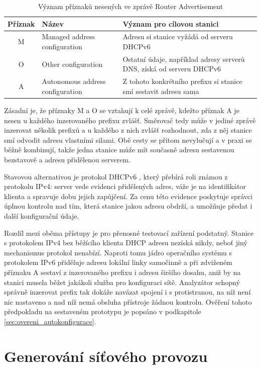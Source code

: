 \begin{table}[htbp]
    \caption{Význam příznaků nesených ve zprávě Router Advertisement}
    \label{tab:priznaky}
    \centering
    \begin{tabular}{clp{7.5cm}}
        \hline
        Příznak & Název & Význam pro cílovou stanici \\
        \hline
        M & Managed address configuration & Adresu si stanice vyžádá od serveru DHCPv6 \\
        O & Other configuration & Ostatní údaje, například adresy serverů DNS, získá od serveru DHCPv6 \\
        A & Autonomous address configuration & Z tohoto konkrétního prefixu si stanice smí sestavit adresu sama \\
        \hline
    \end{tabular}
\end{table}

Zásadní je, že příznaky M a O se vztahují k celé zprávě, kdežto příznak A je nesen u každého inzerovaného prefixu zvlášť. Směrovač tedy může v jediné zprávě inzerovat několik prefixů a u každého z nich zvlášť rozhodnout, zda z něj stanice smí odvodit adresu vlastními silami. Obě cesty se přitom nevylučují a v praxi se běžně kombinují, takže jedna stanice může mít současně adresu sestavenou bezstavově a adresu přidělenou serverem.

Stavovou alternativou je protokol DHCPv6 \cite{rfc8415}, který přebírá roli známou z protokolu IPv4: server vede evidenci přidělených adres, váže je na identifikátor klienta a spravuje dobu jejich zapůjčení. Za cenu této evidence poskytuje správci úplnou kontrolu nad tím, která stanice jakou adresu obdrží, a umožňuje předat i další konfigurační údaje.

Rozdíl mezi oběma přístupy je pro přenosné testovací zařízení podstatný. Stanice s protokolem IPv4 bez běžícího klienta DHCP adresu nezíská nikdy, neboť jiný mechanismus protokol nenabízí. Naproti tomu jádro operačního systému s protokolem IPv6 přiděluje adresu lokální linky samočinně a při zdviženém příznaku A sestaví z inzerovaného prefixu i adresu širšího dosahu, aniž by na stanici musela běžet jakákoli služba pro konfiguraci sítě. Analyzátor schopný správně inzerovat prefix tak dokáže navázat spojení i s protistranou, na níž není nic nastaveno a nad níž nemá obsluha přístroje žádnou kontrolu. Ověření tohoto předpokladu na sestaveném prototypu je popsáno v podkapitole \ref{sec:overeni_autokonfigurace}.

\section{Generování síťového provozu}
\label{sec:generovani}

